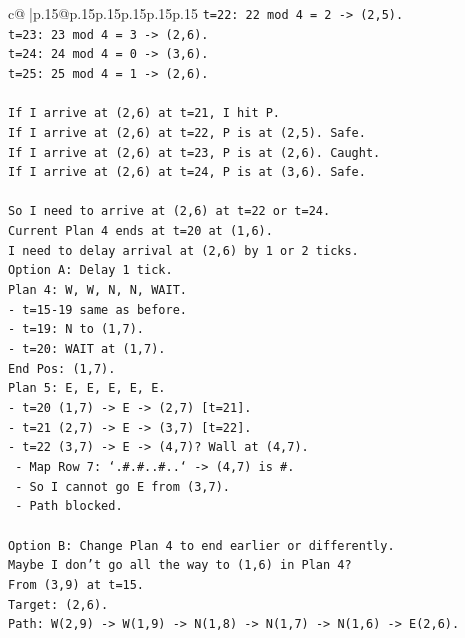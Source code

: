 \documentclass{article}
\begin{document}
{\begin{supertabular}{c@{$\;$}|p{.15\linewidth}@{}p{.15\linewidth}p{.15\linewidth}p{.15\linewidth}p{.15\linewidth}p{.15\linewidth}}
{{{\texttt{t=22: 22 mod 4 = 2 {-}> (2,5).} \\
\texttt{t=23: 23 mod 4 = 3 {-}> (2,6).} \\
\texttt{t=24: 24 mod 4 = 0 {-}> (3,6).} \\
\texttt{t=25: 25 mod 4 = 1 {-}> (2,6).} \\
\\ 
\texttt{If I arrive at (2,6) at t=21, I hit P.} \\
\texttt{If I arrive at (2,6) at t=22, P is at (2,5). Safe.} \\
\texttt{If I arrive at (2,6) at t=23, P is at (2,6). Caught.} \\
\texttt{If I arrive at (2,6) at t=24, P is at (3,6). Safe.} \\
\\ 
\texttt{So I need to arrive at (2,6) at t=22 or t=24.} \\
\texttt{Current Plan 4 ends at t=20 at (1,6).} \\
\texttt{I need to delay arrival at (2,6) by 1 or 2 ticks.} \\
\texttt{Option A: Delay 1 tick.} \\
\texttt{Plan 4: W, W, N, N, WAIT.} \\
\texttt{{-} t=15{-}19 same as before.} \\
\texttt{{-} t=19: N to (1,7).} \\
\texttt{{-} t=20: WAIT at (1,7).} \\
\texttt{End Pos: (1,7).} \\
\texttt{Plan 5: E, E, E, E, E.} \\
\texttt{{-} t=20 (1,7) {-}> E {-}> (2,7) {[}t=21{]}.} \\
\texttt{{-} t=21 (2,7) {-}> E {-}> (3,7) {[}t=22{]}.} \\
\texttt{{-} t=22 (3,7) {-}> E {-}> (4,7)? Wall at (4,7).} \\
\texttt{  {-} Map Row 7: `.\#.\#..\#..` {-}> (4,7) is \#.} \\
\texttt{  {-} So I cannot go E from (3,7).} \\
\texttt{  {-} Path blocked.} \\
\\ 
\texttt{Option B: Change Plan 4 to end earlier or differently.} \\
\texttt{Maybe I don't go all the way to (1,6) in Plan 4?} \\
\texttt{From (3,9) at t=15.} \\
\texttt{Target: (2,6).} \\
\texttt{Path: W(2,9) {-}> W(1,9) {-}> N(1,8) {-}> N(1,7) {-}> N(1,6) {-}> E(2,6).} \\
}}}
\end{supertabular}}
\end{document}

